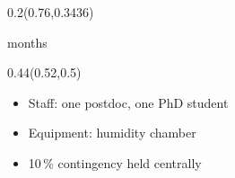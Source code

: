 \documentclass[aspectratio=169]{beamer}
\begin{document}
\begin{frame}[t]
\begin{textblock}{0.2}(0.76,0.3436)
{\centering\fontsize{12}{14}\selectfont \textcolor[HTML]{FFFFFF}{months}\par}
\end{textblock}

\begin{textblock}{0.44}(0.52,0.5)
{\raggedright\fontsize{14}{17}\selectfont \begin{itemize}
\item Staff: one postdoc, one PhD student
\item Equipment: humidity chamber
\item 10\,\% contingency held centrally
\end{itemize}\par}
\end{textblock}
\end{frame}
\end{document}
